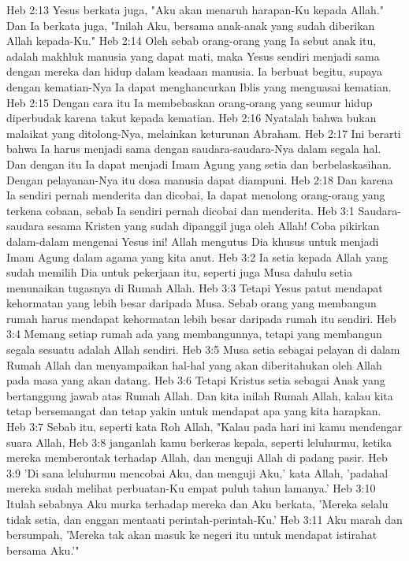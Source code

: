 Heb 2:13  Yesus berkata juga, "Aku akan menaruh harapan-Ku kepada Allah." Dan Ia berkata juga, "Inilah Aku, bersama anak-anak yang sudah diberikan Allah kepada-Ku."
Heb 2:14  Oleh sebab orang-orang yang Ia sebut anak itu, adalah makhluk manusia yang dapat mati, maka Yesus sendiri menjadi sama dengan mereka dan hidup dalam keadaan manusia. Ia berbuat begitu, supaya dengan kematian-Nya Ia dapat menghancurkan Iblis yang menguasai kematian.
Heb 2:15  Dengan cara itu Ia membebaskan orang-orang yang seumur hidup diperbudak karena takut kepada kematian.
Heb 2:16  Nyatalah bahwa bukan malaikat yang ditolong-Nya, melainkan keturunan Abraham.
Heb 2:17  Ini berarti bahwa Ia harus menjadi sama dengan saudara-saudara-Nya dalam segala hal. Dan dengan itu Ia dapat menjadi Imam Agung yang setia dan berbelaskasihan. Dengan pelayanan-Nya itu dosa manusia dapat diampuni.
Heb 2:18  Dan karena Ia sendiri pernah menderita dan dicobai, Ia dapat menolong orang-orang yang terkena cobaan, sebab Ia sendiri pernah dicobai dan menderita.
Heb 3:1  Saudara-saudara sesama Kristen yang sudah dipanggil juga oleh Allah! Coba pikirkan dalam-dalam mengenai Yesus ini! Allah mengutus Dia khusus untuk menjadi Imam Agung dalam agama yang kita anut.
Heb 3:2  Ia setia kepada Allah yang sudah memilih Dia untuk pekerjaan itu, seperti juga Musa dahulu setia menunaikan tugasnya di Rumah Allah.
Heb 3:3  Tetapi Yesus patut mendapat kehormatan yang lebih besar daripada Musa. Sebab orang yang membangun rumah harus mendapat kehormatan lebih besar daripada rumah itu sendiri.
Heb 3:4  Memang setiap rumah ada yang membangunnya, tetapi yang membangun segala sesuatu adalah Allah sendiri.
Heb 3:5  Musa setia sebagai pelayan di dalam Rumah Allah dan menyampaikan hal-hal yang akan diberitahukan oleh Allah pada masa yang akan datang.
Heb 3:6  Tetapi Kristus setia sebagai Anak yang bertanggung jawab atas Rumah Allah. Dan kita inilah Rumah Allah, kalau kita tetap bersemangat dan tetap yakin untuk mendapat apa yang kita harapkan.
Heb 3:7  Sebab itu, seperti kata Roh Allah, "Kalau pada hari ini kamu mendengar suara Allah,
Heb 3:8  janganlah kamu berkeras kepala, seperti leluhurmu, ketika mereka memberontak terhadap Allah, dan menguji Allah di padang pasir.
Heb 3:9  'Di sana leluhurmu mencobai Aku, dan menguji Aku,' kata Allah, 'padahal mereka sudah melihat perbuatan-Ku empat puluh tahun lamanya.'
Heb 3:10  Itulah sebabnya Aku murka terhadap mereka dan Aku berkata, 'Mereka selalu tidak setia, dan enggan mentaati perintah-perintah-Ku.'
Heb 3:11  Aku marah dan bersumpah, 'Mereka tak akan masuk ke negeri itu untuk mendapat istirahat bersama Aku.'"
